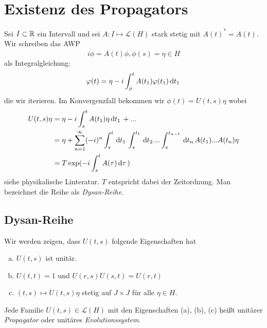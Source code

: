 \documentclass{mycourse}
\begin{document}
\section{Existenz des Propagators}
Sei $I\subset \R$ ein Intervall und sei $A: I \mapsto \mathcal L(H)$ stark stetig mit $A(t)^*=A(t)$. Wir schreiben das AWP
\[
i \dot \phi = A(t) \phi, \phi(s)=\eta \in H
\]
als Integralgleichung:
\[
\phi(t)=\eta-i \int_\rho^t A(t_1) \phi(t_1) \dx[t_1]
\]
die wir iterieren. Im Konvergenzfall bekommen wir $\phi(t)=U(t,s) \eta$ wobei
\begin{align*}
U(t,s) \eta&= \eta- i \int_s^t A(t_1) \eta \dx[t_1]+ ... \\
&= \eta + \sum_{n=1}^\infty (-i)^n \int_s^t \dx[t_1] \int_s^{t_1} \dx[t_2] ... \int_s^{t_{n-1}} \dx[t_n] A(t_1)... A(t_n) \eta\\
&=T \exp(-i \int_s^t A(\tau) \dx[\tau])
\end{align*}
siehe physikalische Linteratur. $T$ entspricht dabei der Zeitordnung. Man bezeichnet die Reihe als \emph{Dysan-Reihe}.
\subsection{Dysan-Reihe}
Wir werden zeigen, dass $U(t,s)$ folgende Eigenschaften hat
\begin{enumerate}[a)]
\item $U(t,s)$ ist unitär.
\item $U(t, t)=1$ und $U(r,s)U(s,t)= U(r,t)$
\item $(t,s)\mapsto U(t,s) \eta$ stetig auf $J\times J$ für alle $\eta \in H$.
\end{enumerate}
Jede Familie $U(t,s)\in \mathcal L(H)$ mit den Eigenschaften (a), (b), (c) heißt unitärer \emph{Propagator} oder unitäres  \emph{Evolutionssystem}.
\end{document}
